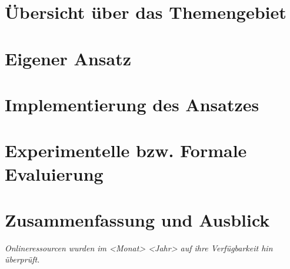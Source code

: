   \chapter{Übersicht über das Themengebiet}
  \lipsum[1-4]  %
  \chapter{Eigener Ansatz}
  \lipsum[1-5]  %
  \chapter{Implementierung des Ansatzes}
  \lipsum[1-4]  %
  \chapter{Experimentelle bzw. Formale Evaluierung}
  \lipsum[1-4]  %
  \chapter{Zusammenfassung und Ausblick}
  \lipsum[1-3]  %

  \backmatter  %
  \appendix  %

  \cleardoublepage
  \printbibliography[title={Literaturverzeichnis}]  %

  \vfill
  \begin{center}
   \emph{Onlineressourcen wurden im <Monat> <Jahr> auf ihre Verfügbarkeit hin überprüft.}
  \end{center}


